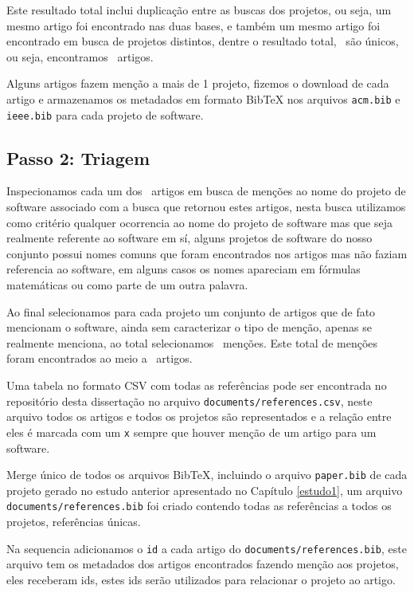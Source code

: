 Este resultado total inclui duplicação entre as buscas dos projetos, ou seja,
um mesmo artigo foi encontrado nas duas bases, e também um mesmo artigo foi
encontrado em busca de projetos distintos, dentre o resultado total,
\SearchUniqueCount \ são únicos, ou seja, encontramos \SearchUniqueCount \ artigos.

Alguns artigos fazem menção a mais de 1 projeto, fizemos o download de cada
artigo e armazenamos os metadados em formato BibTeX nos arquivos \texttt{acm.bib}
e \texttt{ieee.bib} para cada projeto de software.

\subsection{Passo 2: Triagem}

Inspecionamos cada um dos \SearchUniqueCount \ artigos em busca de menções ao
nome do projeto de software associado com a busca que retornou estes artigos,
nesta busca utilizamos como critério qualquer ocorrencia ao nome do projeto de
software mas que seja realmente referente ao software em sí, alguns projetos de
software do nosso conjunto possui nomes comuns que foram encontrados nos
artigos mas não faziam referencia ao software, em alguns casos os nomes
apareciam em fórmulas matemáticas ou como parte de um outra palavra.

Ao final selecionamos para cada projeto um conjunto de artigos que de fato
mencionam o software, ainda sem caracterizar o tipo de menção, apenas se
realmente menciona, ao total selecionamos \ScreeningCount \ menções.
Este total de menções foram encontrados ao meio a \ScreeningUniqueCount \ artigos.

Uma tabela no formato CSV com todas as referências pode ser encontrada no repositório
desta dissertação no arquivo \texttt{documents/references.csv}, neste arquivo todos
os artigos e todos os projetos são representados e a relação entre eles é marcada com
um \texttt{x} sempre que houver menção de um artigo para um software.

Merge único de todos os arquivos BibTeX, incluindo o arquivo \texttt{paper.bib} de
cada projeto gerado no estudo anterior apresentado no Capítulo \ref{estudo1}, um
arquivo \texttt{documents/references.bib} foi criado contendo todas as referências
a todos os projetos, referências únicas.

Na sequencia adicionamos o \texttt{id} a cada artigo do
\texttt{documents/references.bib}, este arquivo tem os metadados dos artigos
encontrados fazendo menção aos projetos, eles receberam ids, estes ids serão
utilizados para relacionar o projeto ao artigo.

